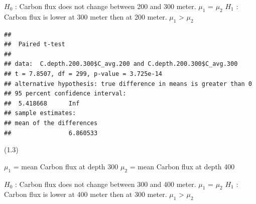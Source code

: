 \documentclass[]{article}
\newenvironment{Shaded}{\begin{snugshade}}{\end{snugshade}}
\newcommand{\DataTypeTok}[1]{\textcolor[rgb]{0.13,0.29,0.53}{#1}}
\newcommand{\FloatTok}[1]{\textcolor[rgb]{0.00,0.00,0.81}{#1}}
\newcommand{\KeywordTok}[1]{\textcolor[rgb]{0.13,0.29,0.53}{\textbf{#1}}}
\newcommand{\NormalTok}[1]{#1}
\newcommand{\OperatorTok}[1]{\textcolor[rgb]{0.81,0.36,0.00}{\textbf{#1}}}
\newcommand{\OtherTok}[1]{\textcolor[rgb]{0.56,0.35,0.01}{#1}}
\newcommand{\StringTok}[1]{\textcolor[rgb]{0.31,0.60,0.02}{#1}}
\begin{document}
\(H_0\) : Carbon flux does not change between 200 and 300 meter.
\(\mu_1\) = \(\mu_2\) \(H_1\) : Carbon flux is lower at 300 meter then
at 200 meter. \(\mu_1\) \textgreater{} \(\mu_2\)

\begin{Shaded}
\end{Shaded}

\begin{verbatim}
## 
##  Paired t-test
## 
## data:  C.depth.200.300$C_avg.200 and C.depth.200.300$C_avg.300
## t = 7.8507, df = 299, p-value = 3.725e-14
## alternative hypothesis: true difference in means is greater than 0
## 95 percent confidence interval:
##  5.418668      Inf
## sample estimates:
## mean of the differences 
##                6.860533
\end{verbatim}

(1.3)

\(\mu_1\) = mean Carbon flux at depth 300 \(\mu_2\) = mean Carbon flux
at depth 400

\(H_0\) : Carbon flux does not change between 300 and 400 meter.
\(\mu_1\) = \(\mu_2\) \(H_1\) : Carbon flux is lower at 400 meter then
at 300 meter. \(\mu_1\) \textgreater{} \(\mu_2\)

\begin{Shaded}
\end{Shaded}
\end{document}

